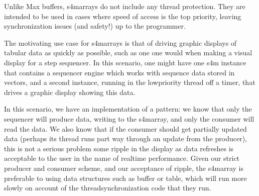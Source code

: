 \documentclass[letterpaper,10pt,english]{sphinxmanual}
\begin{document}
\begin{sphinxVerbatim}[commandchars=\\\{\}]


\end{sphinxVerbatim}

\sphinxAtStartPar
Unlike Max buffers, s4m\sphinxhyphen{}arrays do not
include any thread protection. They are intended to be used in cases
where speed of access is the top priority, leaving synchronization issues
(and safety!) up to the programmer.

\sphinxAtStartPar
The motivating use case for s4m\sphinxhyphen{}arrays is that of driving graphic displays
of tabular data as quickly as possible, such as one
one would when making a visual display for a step sequencer.
In this scenario, one might have one s4m instance
that contains a sequencer engine which works with sequence data stored in vectors,
and a second instance, running in the low\sphinxhyphen{}priority thread off a timer, that drives
a graphic display showing this data.

\sphinxAtStartPar
In this scenario, we have an implementation of a 
pattern: we know that only the sequencer will produce data, writing to the
s4m\sphinxhyphen{}array, and only the consumer will read the data.
We also know that if the consumer should get partially updated data
(perhaps its thread runs part way through an update from the producer),
this is not a serious problem \sphinxhyphen{} some ripple in the display as data refreshes
is acceptable to the user in the name of realtime performance.
Given our strict producer and consumer scheme, and our acceptance of ripple,
the s4m\sphinxhyphen{}array is preferable to using data structures such as buffer or table,
which will run more slowly on account of the thread\sphinxhyphen{}synchronization code
that they run.
\end{document}

